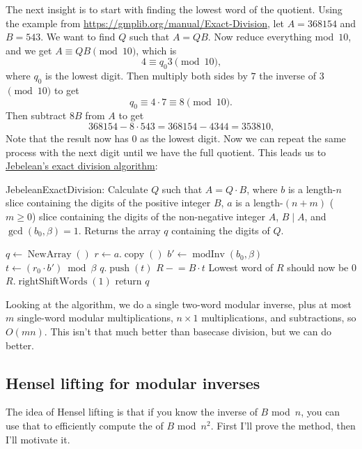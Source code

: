 \documentclass{computer-arithmetic}
\begin{document}
The next insight is to start with finding the lowest word of the
quotient. Using the example from
\url{https://gmplib.org/manual/Exact-Division}, let \(A = 368154\) and
\(B = 543\). We want to find \(Q\) such that \(A = QB\). Now reduce
everything mod~\(10\), and we get \(A ≡ QB \pmod{10}\), which is
\[
  4 ≡ q_0 3 \pmod{10}\text{,}
\]
where \(q_0\) is the lowest digit. Then multiply both sides by \(7\) the
inverse of \(3\) \(\pmod{10}\) to get
\[
  q_0 ≡ 4 ⋅ 7 ≡ 8 \pmod{10}\text{.}
\]
Then subtract \(8B\) from \(A\) to get
\[
  368154 - 8 ⋅ 543 = 368154 - 4344 = 353810\text{,}
\]
Note that the result now has \(0\) as the lowest digit. Now we can
repeat the same process with the next digit until we have the full
quotient. This leads us to
\href{https://www.sciencedirect.com/science/article/pii/S0747717183710126}{Jebelean's
  exact division algorithm}:

\begin{algorithm}[H]
  \caption{JebeleanExactDivision: Calculate \(Q\) such that
    \(A = Q ⋅ B\), where \(b\) is a length-\(n\) slice containing the
    digits of the positive integer \(B\), \(a\) is a
    length-\((n + m)\) (\(m ≥ 0\)) slice containing the digits of the
    non-negative integer \(A\), \(B \mid A\), and
    \(\gcd(b_0, β) = 1\). Returns the array \(q\) containing the
    digits of \(Q\).}
  \begin{algorithmic}[1]
    \State \(q ← \operatorname{NewArray}()\)
    \State \(r ← a.\operatorname{copy}()\)
    \State \(b' ← \operatorname{modInv}(b_0, β)\)
    \State \(t ← (r_0 ⋅ b') \bmod β\)
    \State \(q.\operatorname{push}(t)\)
    \State \(R \mathrel{-}= B ⋅ t\)
    \Comment Lowest word of \(R\) should now be \(0\)
    \State \(R.\operatorname{rightShiftWords}(1)\)
    \EndWhile
    \State return \(q\)
\end{algorithmic}
\end{algorithm}

Looking at the algorithm, we do a single two-word modular inverse,
plus at most \(m\) single-word modular multiplications, \(n × 1\)
multiplications, and subtractions, so \(O(mn)\). This isn't that much
better than basecase division, but we can do better.

\subsection{Hensel lifting for modular inverses}

The idea of Hensel lifting is that if you know the inverse of \(B\)
mod~\(n\), you can use that to efficiently compute the of \(B\)
mod~\(n^2\). First I'll prove the method, then I'll motivate it.
\end{document}
